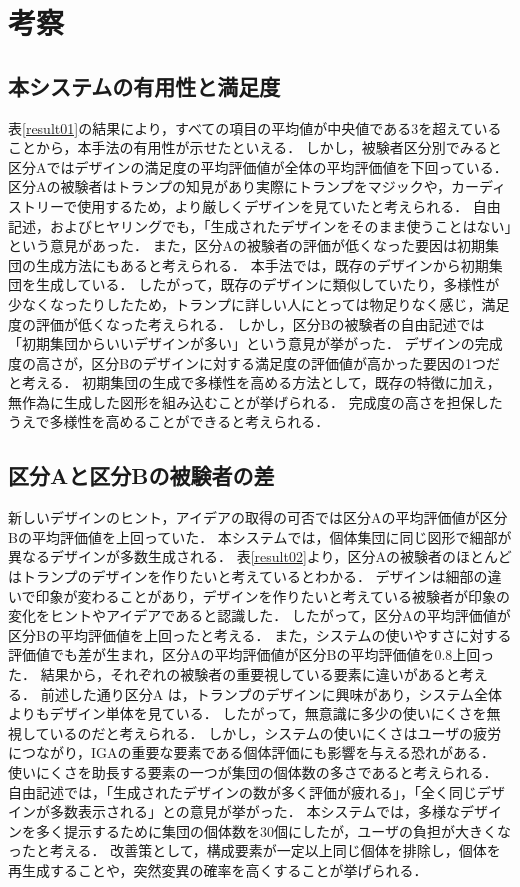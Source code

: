 \chapter{考察}
\section{本システムの有用性と満足度}
表\ref{result01}の結果により，すべての項目の平均値が中央値である3を超えていることから，本手法の有用性が示せたといえる．
しかし，被験者区分別でみると区分Aではデザインの満足度の平均評価値が全体の平均評価値を下回っている．
区分Aの被験者はトランプの知見があり実際にトランプをマジックや，カーディストリーで使用するため，より厳しくデザインを見ていたと考えられる．
自由記述，およびヒヤリングでも，「生成されたデザインをそのまま使うことはない」という意見があった．
また，区分Aの被験者の評価が低くなった要因は初期集団の生成方法にもあると考えられる．
本手法では，既存のデザインから初期集団を生成している．
したがって，既存のデザインに類似していたり，多様性が少なくなったりしたため，トランプに詳しい人にとっては物足りなく感じ，満足度の評価が低くなった考えられる．
しかし，区分Bの被験者の自由記述では「初期集団からいいデザインが多い」という意見が挙がった．
デザインの完成度の高さが，区分Bのデザインに対する満足度の評価値が高かった要因の1つだと考える．
初期集団の生成で多様性を高める方法として，既存の特徴に加え，無作為に生成した図形を組み込むことが挙げられる．
完成度の高さを担保したうえで多様性を高めることができると考えられる．

\section{区分Aと区分Bの被験者の差}
新しいデザインのヒント，アイデアの取得の可否では区分Aの平均評価値が区分Bの平均評価値を上回っていた．
本システムでは，個体集団に同じ図形で細部が異なるデザインが多数生成される．
表\ref{result02}より，区分Aの被験者のほとんどはトランプのデザインを作りたいと考えているとわかる．
デザインは細部の違いで印象が変わることがあり，デザインを作りたいと考えている被験者が印象の変化をヒントやアイデアであると認識した．
したがって，区分Aの平均評価値が区分Bの平均評価値を上回ったと考える．
また，システムの使いやすさに対する評価値でも差が生まれ，区分Aの平均評価値が区分Bの平均評価値を0.8上回った．
結果から，それぞれの被験者の重要視している要素に違いがあると考える．
前述した通り区分A は，トランプのデザインに興味があり，システム全体よりもデザイン単体を見ている．
したがって，無意識に多少の使いにくさを無視しているのだと考えられる．
しかし，システムの使いにくさはユーザの疲労につながり，IGAの重要な要素である個体評価にも影響を与える恐れがある．
使いにくさを助長する要素の一つが集団の個体数の多さであると考えられる．
自由記述では，「生成されたデザインの数が多く評価が疲れる」，「全く同じデザインが多数表示される」との意見が挙がった．
本システムでは，多様なデザインを多く提示するために集団の個体数を30個にしたが，ユーザの負担が大きくなったと考える．
改善策として，構成要素が一定以上同じ個体を排除し，個体を再生成することや，突然変異の確率を高くすることが挙げられる．

